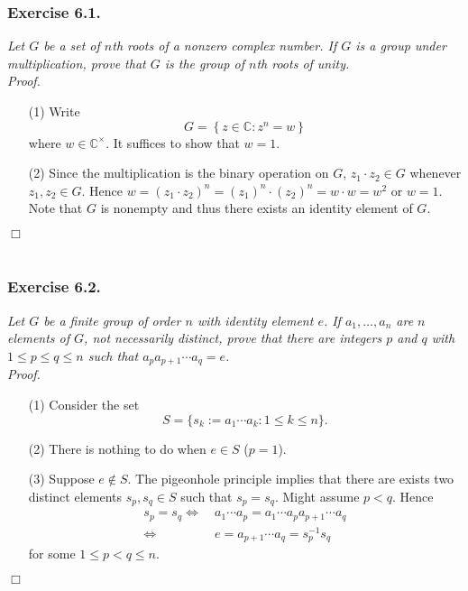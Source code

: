 \documentclass{article}
\begin{document}
\subsubsection*{Exercise 6.1.}
\emph{Let $G$ be a set of $n$th roots of a nonzero complex number.
If $G$ is a group under multiplication,
prove that $G$ is the group of $n$th roots of unity.} \\



\emph{Proof.}
\begin{enumerate}
\item[(1)]
  Write
  \[
    G = \left\{ z \in \mathbb{C} : z^n = w \right\}
  \]
  where $w \in \mathbb{C}^{\times}$.
  It suffices to show that $w = 1$.

\item[(2)]
  Since the multiplication is the binary operation on $G$,
  $z_1 \cdot z_2 \in G$ whenever $z_1, z_2 \in G$.
  Hence $w = (z_1 \cdot z_2)^n = (z_1)^n \cdot (z_2)^n = w \cdot w= w^2$ or $w = 1$.
  Note that $G$ is nonempty and thus there exists an identity element of $G$.
\end{enumerate}
$\Box$ \\\\






\subsubsection*{Exercise 6.2.}
\emph{Let $G$ be a finite group of order $n$ with identity element $e$.
If $a_1, \ldots, a_n$ are $n$ elements of $G$, not necessarily distinct,
prove that there are integers $p$ and $q$ with
$1 \leq p \leq q \leq n$ such that $a_p a_{p+1} \cdots a_q = e$.} \\



\emph{Proof.}
\begin{enumerate}
\item[(1)]
  Consider the set
  \[
    S
    = \{ s_k := a_1 \cdots a_k : 1 \leq k \leq n \}.
  \]

\item[(2)]
  There is nothing to do when $e \in S$ ($p = 1$).

\item[(3)]
  Suppose $e \not\in S$.
  The pigeonhole principle implies that
  there are exists two distinct elements $s_p, s_q \in S$ such that $s_p = s_q$.
  Might assume $p < q$.
  Hence
  \begin{align*}
    s_p = s_q
    \Longleftrightarrow &\:
    a_1 \cdots a_p = a_1 \cdots a_p a_{p+1} \cdots a_q \\
    \Longleftrightarrow &\:
    e = a_{p+1} \cdots a_q = s_p^{-1} s_q
  \end{align*}
  for some $1 \leq p < q \leq n$.
\end{enumerate}
$\Box$ \\\\
\end{document}
